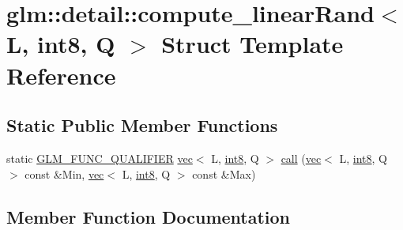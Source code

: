 \hypertarget{structglm_1_1detail_1_1compute__linear_rand_3_01_l_00_01int8_00_01_q_01_4}{}\section{glm\+:\+:detail\+:\+:compute\+\_\+linear\+Rand$<$ L, int8, Q $>$ Struct Template Reference}
\label{structglm_1_1detail_1_1compute__linear_rand_3_01_l_00_01int8_00_01_q_01_4}
\subsection*{Static Public Member Functions}
\begin{DoxyCompactItemize}
\item 
static \mbox{\hyperlink{setup_8hpp_a33fdea6f91c5f834105f7415e2a64407}{G\+L\+M\+\_\+\+F\+U\+N\+C\+\_\+\+Q\+U\+A\+L\+I\+F\+I\+ER}} \mbox{\hyperlink{structglm_1_1vec}{vec}}$<$ L, \mbox{\hyperlink{namespaceglm_1_1detail_a04b526a8d7a9b455602a0afa78c531e0}{int8}}, Q $>$ \mbox{\hyperlink{structglm_1_1detail_1_1compute__linear_rand_3_01_l_00_01int8_00_01_q_01_4_a77196d894abedcf8494dd983781432bf}{call}} (\mbox{\hyperlink{structglm_1_1vec}{vec}}$<$ L, \mbox{\hyperlink{namespaceglm_1_1detail_a04b526a8d7a9b455602a0afa78c531e0}{int8}}, Q $>$ const \&Min, \mbox{\hyperlink{structglm_1_1vec}{vec}}$<$ L, \mbox{\hyperlink{namespaceglm_1_1detail_a04b526a8d7a9b455602a0afa78c531e0}{int8}}, Q $>$ const \&Max)
\end{DoxyCompactItemize}


\subsection{Member Function Documentation}
\mbox{\label{structglm_1_1detail_1_1compute__linear_rand_3_01_l_00_01int8_00_01_q_01_4_a77196d894abedcf8494dd983781432bf}} 
